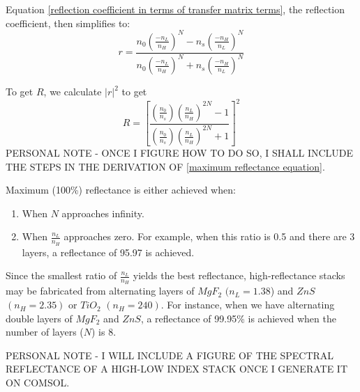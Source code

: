Equation \ref{reflection coefficient in terms of transfer matrix terms}, the reflection coefficient, then simplifies to:
\begin{equation}\label{reflection coefficient for double high-reflectance layers}
r = \frac{n_0\left(\frac{-n_L}{n_H}\right)^N - n_s\left(\frac{-n_H}{n_L}\right)^N}{n_0\left(\frac{-n_L}{n_H}\right)^N + n_s\left(\frac{-n_H}{n_L}\right)^N}
\end{equation}

To get $R$, we calculate $|r|^2$ to get
\begin{equation}\label{maximum reflectance equation}
R = \left[ \frac{ \left( \frac{n_0}{n_s} \right) \left( \frac{n_L}{n_H} \right)^{2N}  - 1 }{  \left( \frac{n_0}{n_s} \right) \left( \frac{n_L}{n_H} \right)^{2N}  + 1     }  \right]^2
\end{equation}
PERSONAL NOTE - ONCE I FIGURE HOW TO DO SO, I SHALL INCLUDE THE STEPS IN THE DERIVATION OF \ref{maximum reflectance equation}.

Maximum (100\%) reflectance is either achieved when:
\begin{enumerate}
  \item When $N$ approaches infinity.
  \item When $\frac{n_L}{n_H}$ approaches zero. For example, when this ratio is 0.5 and there are 3 layers, a reflectance of 95.97 is achieved.
\end{enumerate}
Since the smallest ratio of $\frac{n_L}{n_H}$ yields the best reflectance, high-reflectance stacks may be fabricated from alternating layers of $MgF_2$ $(n_L = 1.38$) and $ZnS$ $(n_H = 2.35)$ or $TiO_2$ $(n_H = 240)$. For instance, when we have alternating double layers of $MgF_2$ and $ZnS$, a reflectance of 99.95\% is achieved when the number of layers ($N$) is 8.

PERSONAL NOTE - I WILL INCLUDE A FIGURE OF THE SPECTRAL REFLECTANCE OF A HIGH-LOW INDEX STACK ONCE I GENERATE IT ON COMSOL.
